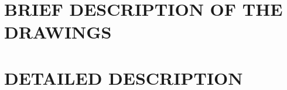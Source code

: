 \documentclass[12pt,letterpaper]{article}
\begin{document}
\section*{BRIEF DESCRIPTION OF THE DRAWINGS}

%

\section*{DETAILED DESCRIPTION}
\end{document}
